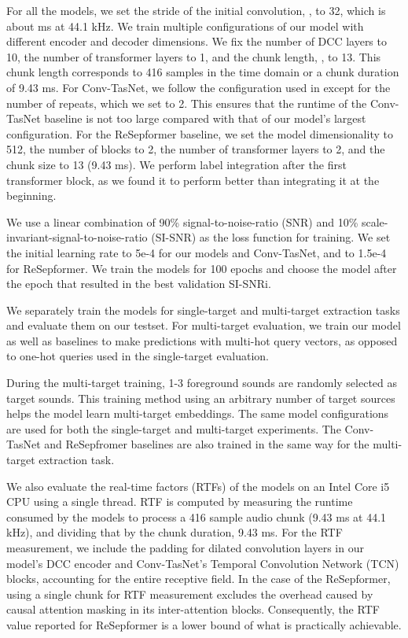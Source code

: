 For all the models, we set the stride of the initial convolution, , to 32, which is  about  ms at 44.1 kHz. We train multiple configurations of our model with different encoder and decoder dimensions. We fix the number of DCC layers to 10, the number of transformer layers to 1, and the chunk length, , to 13. This chunk length corresponds to 416 samples in the time domain or a chunk duration of 9.43 ms.   
For Conv-TasNet, we follow the configuration used in \cite{2020arXiv200605712O} except for the number of repeats, which we set to 2. This ensures that the runtime of the Conv-TasNet baseline is not too large compared with that of our model's largest configuration. For the ReSepformer baseline, we set the model dimensionality to 512, the number of blocks to 2, the number of transformer layers to 2, and the chunk size to 13 (9.43 ms). We perform label integration after the first transformer block, as we found it to perform better than integrating it  at the beginning.

\vskip 0.05in { We use a linear combination of 90\% signal-to-noise-ratio (SNR) and 10\% scale-invariant-signal-to-noise-ratio (SI-SNR) \cite{https://doi.org/10.48550/arxiv.1811.02508} as the loss function for training.
We set the initial learning rate to 5e-4 for our models and Conv-TasNet, and to 1.5e-4 for  ReSepformer. We train the models for 100 epochs and choose the model after the epoch that resulted in the best validation SI-SNRi.
}


\vskip 0.05in We separately train the models for single-target and multi-target extraction tasks and evaluate them on our testset. For multi-target evaluation, we train our model as well as baselines to make predictions with multi-hot query vectors, as opposed to one-hot queries used in the single-target evaluation. { During the multi-target training, 1-3 foreground sounds are randomly selected as target sounds. This training method using an arbitrary number of target sources helps the model learn multi-target embeddings. The same model configurations are used for both the single-target and multi-target experiments.  The Conv-TasNet and ReSepfromer baselines are also trained in the same way for the multi-target extraction task.


We also evaluate the real-time factors (RTFs) of the models on an Intel Core i5 CPU using a single thread. RTF is computed by measuring the runtime consumed by the models to process a 416 sample audio chunk (9.43 ms at 44.1 kHz), and dividing that by the chunk duration, 9.43 ms. {For the RTF measurement, we include the padding for dilated convolution layers in our model's DCC encoder and Conv-TasNet's Temporal Convolution Network (TCN) blocks, accounting for the entire receptive field. In the case of the ReSepformer, using a single chunk for RTF measurement excludes the overhead caused by causal attention masking in its inter-attention blocks. Consequently, the RTF value reported for ReSepformer is a lower bound of what is practically achievable.}}

